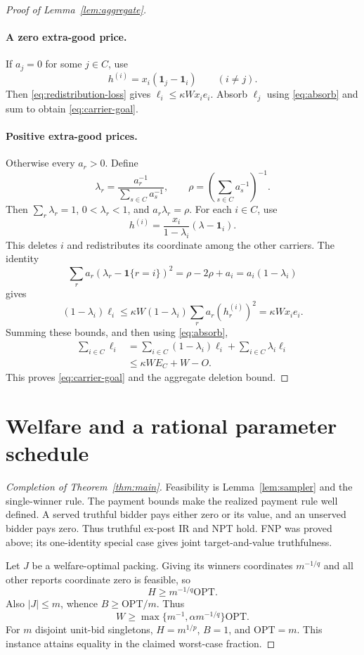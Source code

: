 \documentclass[11pt]{article}
\begin{document}
\begin{proof}[Proof of Lemma~\ref{lem:aggregate}]
\paragraph{A zero extra-good price.}
If $a_j=0$ for some $j\in C$, use
\[
h^{(i)}=x_i(\mathbf{1}_j-\mathbf{1}_i)
\qquad(i\ne j).
\]
Then \eqref{eq:redistribution-loss} gives
$\ell_i\le\kappa W x_ie_i$.
Absorb $\ell_j$ using \eqref{eq:absorb} and sum to obtain
\eqref{eq:carrier-goal}.

\paragraph{Positive extra-good prices.}
Otherwise every $a_r>0$.
Define
\[
\lambda_r
=
\frac{a_r^{-1}}{\sum_{s\in C}a_s^{-1}},
\qquad
\rho
=
\left(\sum_{s\in C}a_s^{-1}\right)^{-1}.
\]
Then $\sum_r\lambda_r=1$, $0<\lambda_r<1$, and
$a_r\lambda_r=\rho$.
For each $i\in C$, use
\[
h^{(i)}
=
\frac{x_i}{1-\lambda_i}(\lambda-\mathbf{1}_i).
\]
This deletes $i$ and redistributes its coordinate among the
other carriers.
The identity
\[
\sum_ra_r(\lambda_r-\mathbf{1}\{r=i\})^2
=
\rho-2\rho+a_i
=
a_i(1-\lambda_i)
\]
gives
\[
(1-\lambda_i)\ell_i
\le
\kappa W(1-\lambda_i)
\sum_ra_r(h_r^{(i)})^2
=
\kappa W x_ie_i.
\]
Summing these bounds, and then using \eqref{eq:absorb},
\begin{align*}
\sum_{i\in C}\ell_i
&=
\sum_{i\in C}(1-\lambda_i)\ell_i
+
\sum_{i\in C}\lambda_i\ell_i\\
&\le
\kappa WE_C+W-O.
\end{align*}
This proves \eqref{eq:carrier-goal} and the aggregate deletion
bound.
\end{proof}


\section{Welfare and a rational parameter schedule}

\begin{proof}[Completion of Theorem~\ref{thm:main}]
Feasibility is Lemma~\ref{lem:sampler} and the single-winner rule.
The payment bounds make the realized payment rule well defined.
A served truthful bidder pays either zero or its value,
and an unserved bidder pays zero.
Thus truthful ex-post IR and NPT hold.
FNP was proved above; its one-identity special case gives joint
target-and-value truthfulness.

Let $J$ be a welfare-optimal packing.
Giving its winners coordinates $m^{-1/q}$ and all other reports
coordinate zero is feasible, so
\[
H\ge m^{-1/q}\mathrm{OPT}.
\]
Also $|J|\le m$, whence $B\ge\mathrm{OPT}/m$.
Thus
\[
W
\ge
\max\{m^{-1},\alpha m^{-1/q}\}\mathrm{OPT}.
\]
For $m$ disjoint unit-bid singletons,
$H=m^{1/p}$, $B=1$, and $\mathrm{OPT}=m$.
This instance attains equality in the claimed worst-case fraction.
\end{proof}
\end{document}
